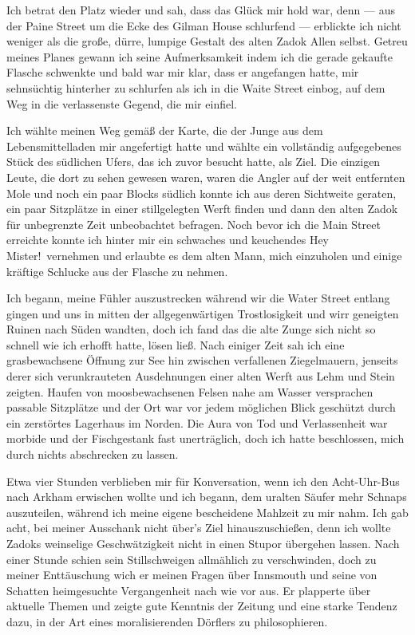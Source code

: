 Ich betrat den Platz wieder und sah, dass das Glück mir hold war, denn --- aus der Paine Street um die Ecke des Gilman House schlurfend --- erblickte ich nicht weniger als die große, dürre, lumpige Gestalt des alten Zadok Allen selbst. Getreu meines Planes gewann ich seine Aufmerksamkeit indem ich die gerade gekaufte Flasche schwenkte und bald war mir klar, dass er angefangen hatte, mir sehnsüchtig hinterher zu schlurfen als ich in die Waite Street einbog, auf dem Weg in die verlassenste Gegend, die mir einfiel.

Ich wählte meinen Weg gemäß der Karte, die der Junge aus dem Lebensmittelladen mir angefertigt hatte und wählte ein vollständig aufgegebenes Stück des südlichen Ufers, das ich zuvor besucht hatte, als Ziel. Die einzigen Leute, die dort zu sehen gewesen waren, waren die Angler auf der weit entfernten Mole und noch ein paar Blocks südlich konnte ich aus deren Sichtweite geraten, ein paar Sitzplätze in einer stillgelegten Werft finden und dann den alten Zadok für unbegrenzte Zeit unbeobachtet befragen. Noch bevor ich die Main Street erreichte konnte ich hinter mir ein schwaches und keuchendes \glqq Hey Mister!\grqq\ vernehmen und erlaubte es dem alten Mann, mich einzuholen und einige kräftige Schlucke aus der Flasche zu nehmen.

Ich begann, meine Fühler auszustrecken während wir die Water Street entlang gingen und uns in mitten der allgegenwärtigen Trostlosigkeit und wirr geneigten Ruinen nach Süden wandten, doch ich fand das die alte Zunge sich nicht so schnell wie ich erhofft hatte, lösen ließ. Nach einiger Zeit sah ich eine grasbewachsene Öffnung zur See hin zwischen verfallenen Ziegelmauern, jenseits derer sich verunkrauteten Ausdehnungen einer alten Werft aus Lehm und Stein zeigten. Haufen von moosbewachsenen Felsen nahe am Wasser versprachen passable Sitzplätze und der Ort war vor jedem möglichen Blick geschützt durch ein zerstörtes Lagerhaus im Norden. Die Aura von Tod und Verlassenheit war morbide und der Fischgestank fast unerträglich, doch ich hatte beschlossen, mich durch nichts abschrecken zu lassen.

Etwa vier Stunden verblieben mir für Konversation, wenn ich den Acht-Uhr-Bus nach Arkham erwischen wollte und ich begann, dem uralten Säufer mehr Schnaps auszuteilen, während ich meine eigene bescheidene Mahlzeit zu mir nahm. Ich gab acht, bei meiner Ausschank nicht über's Ziel hinauszuschießen, denn ich wollte Zadoks weinselige Geschwätzigkeit nicht in einen Stupor übergehen lassen. Nach einer Stunde schien sein Stillschweigen allmählich zu verschwinden, doch zu meiner Enttäuschung wich er meinen Fragen über Innsmouth und seine von Schatten heimgesuchte Vergangenheit nach wie vor aus. Er plapperte über aktuelle Themen und zeigte gute Kenntnis der Zeitung und eine starke Tendenz dazu, in der Art eines moralisierenden Dörflers zu philosophieren.

